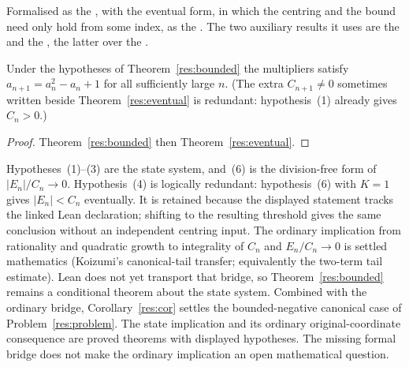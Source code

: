 \noindent Formalised as the
, with the eventual form, in which the centring and the bound need
only hold from some index, as the
.  The two auxiliary results it uses are the
 and the
, the latter over the
.

\begin{corollary}\label{res:cor}
Under the hypotheses of Theorem~\ref{res:bounded} the multipliers satisfy
$a_{n+1}=a_n^{2}-a_n+1$ for all sufficiently large $n$.
(The extra $C_{n+1}\ne0$ sometimes written beside Theorem~\ref{res:eventual}
is redundant: hypothesis~(1) already gives $C_n>0$.)
\end{corollary}

\begin{proof}
Theorem~\ref{res:bounded} then Theorem~\ref{res:eventual}.
\end{proof}

Hypotheses~(1)--(3) are the state system, and~(6) is the division-free form of
$|E_n|/C_n\to0$.  Hypothesis~(4) is logically redundant: hypothesis~(6) with
$K=1$ gives $|E_n|<C_n$ eventually.  It is retained because the displayed
statement tracks the linked Lean declaration; shifting to the resulting
threshold gives the same conclusion without an independent centring input.
The ordinary implication from rationality and quadratic growth to integrality
of $C_n$ and $E_n/C_n\to0$ is settled mathematics (Koizumi's canonical-tail
transfer; equivalently the two-term tail estimate).  Lean does not yet
transport that bridge, so Theorem~\ref{res:bounded} remains a conditional
theorem about the state system.  Combined with the ordinary bridge,
Corollary~\ref{res:cor} settles the bounded-negative canonical case of
Problem~\ref{res:problem}.  The state implication and its ordinary original-coordinate consequence are
proved theorems with displayed hypotheses.  The missing formal bridge does
not make the ordinary implication an open mathematical question.

